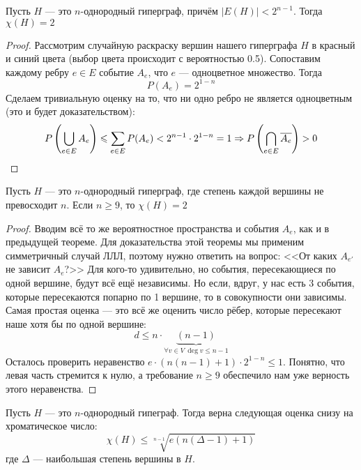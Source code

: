 \begin{theorem}
	Пусть $H$ --- это $n$-однородный гиперграф, причём $|E(H)| < 2^{n - 1}$. Тогда $\chi(H) = 2$
\end{theorem}

\begin{proof}
	Рассмотрим случайную раскраску вершин нашего гиперграфа $H$ в красный и синий цвета (выбор цвета происходит с вероятностью 0.5). Сопоставим каждому ребру $e \in E$ событие $A_e$, что $e$ --- одноцветное множество. Тогда
	\[
		P(A_e) = 2^{1 - n}
	\]
	Сделаем тривиальную оценку на то, что ни одно ребро не является одноцветным (это и будет доказательством):
	\[
		P\left(\bigcup_{e \in E} A_e\right) \leqslant \sum_{e \in E} P(A_e) < 2^{n - 1} \cdot 2^{1 - n} = 1 \Rightarrow P\left(\bigcap_{e \in E} \overline{A_e}\right) > 0
	\]
\end{proof}

\begin{theorem}
	Пусть $H$ --- это $n$-однородный гиперграф, где степень каждой вершины не превосходит $n$. Если $n \ge 9$, то $\chi(H) = 2$
\end{theorem}

\begin{proof}
	Вводим всё то же вероятностное пространства и события $A_e$, как и в предыдущей теореме. Для доказательства этой теоремы мы применим симметричный случай ЛЛЛ, поэтому нужно ответить на вопрос: <<От каких $A_{e'}$ не зависит $A_e$?>> Для кого-то удивительно, но события, пересекающиеся по одной вершине, будут всё ещё независимы. Но если, вдруг, у нас есть 3 события, которые пересекаются попарно по 1 вершине, то в совокупности они зависимы. Самая простая оценка --- это всё же оценить число рёбер, которые пересекают наше хотя бы по одной вершине:
	\[
		d \le n \cdot \underbrace{(n - 1)}_{\forall v \in V\ \deg v \le n - 1}
	\]
	Осталось проверить неравенство $e \cdot (n(n - 1) + 1) \cdot 2^{1 - n} \le 1$. Понятно, что левая часть стремится к нулю, а требование $n \ge 9$ обеспечило нам уже верность этого неравенства.
\end{proof}

\begin{theorem}
	Пусть $H$ --- это $n$-однородный гипеграф. Тогда верна следующая оценка снизу на хроматическое число:
	\[
		\chi(H) \le \sqrt[n - 1]{e(n(\Delta - 1) + 1)}
	\]
	где $\Delta$ --- наибольшая степень вершины в $H$.
\end{theorem}

